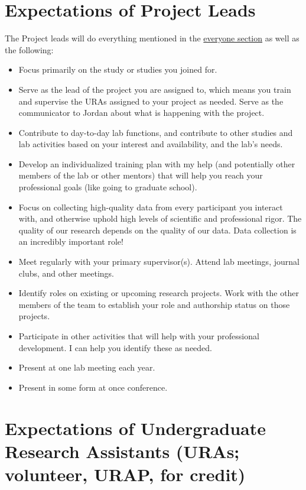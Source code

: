 \documentclass[
]{book}
\begin{document}
\hypertarget{expectations-of-project-leads}{%
\section{Expectations of Project Leads}\label{expectations-of-project-leads}}

The Project leads will do everything mentioned in the \protect\hyperlink{everyone}{everyone section} as well as the following:

\begin{itemize}
\item
  Focus primarily on the study or studies you joined for.
\item
  Serve as the lead of the project you are assigned to, which means you train and supervise the URAs assigned to your project as needed. Serve as the communicator to Jordan about what is happening with the project.
\item
  Contribute to day-to-day lab functions, and contribute to other studies and lab activities based on your interest and availability, and the lab's needs.
\item
  Develop an individualized training plan with my help (and potentially other members of the lab or other mentors) that will help you reach your professional goals (like going to graduate school).
\item
  Focus on collecting high-quality data from every participant you interact with, and otherwise uphold high levels of scientific and professional rigor. The quality of our research depends on the quality of our data. Data collection is an incredibly important role!
\item
  Meet regularly with your primary supervisor(s). Attend lab meetings, journal clubs, and other meetings.
\item
  Identify roles on existing or upcoming research projects. Work with the other members of the team to establish your role and authorship status on those projects.
\item
  Participate in other activities that will help with your professional development. I can help you identify these as needed.
\item
  Present at one lab meeting each year.
\item
  Present in some form at once conference.
\end{itemize}

\hypertarget{expectations-of-undergraduate-research-assistants-uras-volunteer-urap-for-credit}{%
\section{Expectations of Undergraduate Research Assistants (URAs; volunteer, URAP, for credit)}\label{expectations-of-undergraduate-research-assistants-uras-volunteer-urap-for-credit}}
\end{document}
